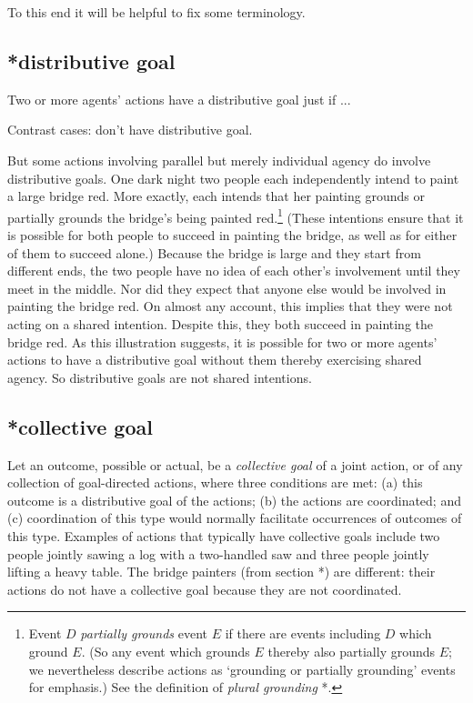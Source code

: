 \documentclass[12pt,\papersize]{extarticle}
\begin{document}
To this end it will be helpful to fix some terminology.


\subsection{*distributive goal}
Two or more agents' actions have a distributive goal just if ...

Contrast cases: don't have distributive goal.

But some actions involving parallel but merely individual agency do involve distributive goals.  
One dark night two people each independently intend to paint a large bridge red.   
More exactly, each intends that her painting grounds or partially grounds the bridge's being painted red.\footnote{
Event $D$ \emph{partially grounds} event $E$ if there are events including $D$ which ground $E$.
(So any event which grounds $E$ thereby also partially grounds $E$; 
we nevertheless describe actions as `grounding or partially grounding' events for emphasis.)
See the definition of \emph{plural grounding} *.
}  
(These intentions ensure that it is possible for both people to succeed in painting the bridge, as well as for either of them to succeed alone.)
Because the bridge is large and they start from different ends, the two people have no idea of each other's involvement until they meet in the middle.
Nor did they expect that anyone else would be involved in painting the bridge red.  
On almost any account, this implies that they were not acting on a shared intention.
Despite this, 
they both succeed in painting the bridge red. 
As this illustration suggests, 
it is possible for two or more agents' actions to have a distributive goal without them thereby exercising shared agency.
So distributive goals are not shared intentions.




\subsection{*collective goal}
Let an outcome, possible or actual, be a \emph{collective goal \label{df_collective_goal}} of a joint action, or of any collection of goal-directed actions, where three conditions are met: 
	(a) this outcome is a distributive goal of the actions; 
	(b) the actions are coordinated; and 
	(c)  coordination of this type would normally  facilitate occurrences of outcomes of this type.  
Examples of actions  that typically have collective goals include two people jointly sawing a log with a two-handled saw and  
three people jointly lifting a heavy table.
The bridge painters (from section *) are different: their actions do not have a collective goal because they are not coordinated.
\end{document}
